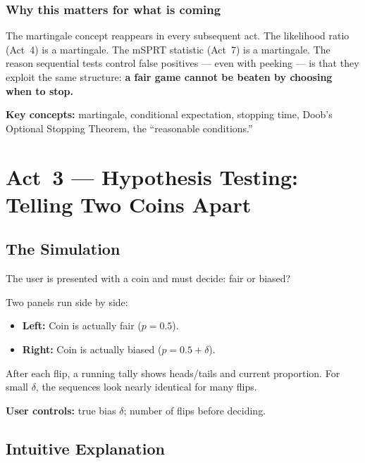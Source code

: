 \documentclass[12pt, a4paper]{article}
\begin{document}
\subsubsection*{Why this matters for what is coming}

The martingale concept reappears in every subsequent act.  The likelihood
ratio (Act~4) is a martingale.  The mSPRT statistic (Act~7) is a martingale.
The reason sequential tests control false positives --- even with peeking ---
is that they exploit the same structure: \textbf{a fair game cannot be beaten
by choosing when to stop.}

\begin{keytakeaway}
\textbf{Key concepts:} martingale, conditional expectation, stopping time,
Doob's Optional Stopping Theorem, the ``reasonable conditions.''
\end{keytakeaway}


\newpage
\section{Act~3 --- Hypothesis Testing: Telling Two Coins Apart}

\subsection{The Simulation}

\begin{simulation}
The user is presented with a coin and must decide: fair or biased?

Two panels run side by side:
\begin{itemize}[nosep]
  \item \textbf{Left:} Coin is actually fair ($p=0.5$).
  \item \textbf{Right:} Coin is actually biased ($p=0.5+\delta$).
\end{itemize}
After each flip, a running tally shows heads/tails and current proportion.
For small $\delta$, the sequences look nearly identical for many flips.

\textbf{User controls:} true bias $\delta$; number of flips before deciding.
\end{simulation}

\subsection{Intuitive Explanation}
\end{document}
